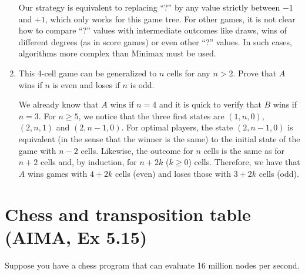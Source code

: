 \documentclass[11pt, a4paper]{article}
\begin{document}
\begin{enumerate}
\begin{solution}
\begin{figure}[H]
{}
        \end{figure}

        Our strategy is equivalent to replacing \enquote{?} by any value strictly between $-1$ and $+1$, which only works for this game tree. For other games, it is not clear how to compare \enquote{?} values with intermediate outcomes like draws, wins of different degrees (as in score games) or even other \enquote{?} values. In such cases, algorithms more complex than Minimax must be used.
    \end{solution}

    \item This 4-cell game can be generalized to $n$ cells for any $n > 2$. Prove that $A$ wins if $n$ is even and loses if $n$ is odd.

    \begin{solution}
        We already know that $A$ wins if $n = 4$ and it is quick to verify that $B$ wins if $n = 3$. For $n \geq 5$, we notice that the three first states are $(1, n, 0)$, $(2, n, 1)$ and $(2, n - 1, 0)$. For optimal players, the state $(2, n - 1, 0)$ is equivalent (in the sense that the winner is the same) to the initial state of the game with $n - 2$ cells. Likewise, the outcome for $n$ cells is the same as for $n + 2$ cells and, by induction, for $n + 2k$ ($k \geq 0$) cells. Therefore, we have that $A$ wins games with $4 + 2k$ cells (even) and loses those with $3 + 2k$ cells (odd).
    \end{solution}
\end{enumerate}

\newpage

\section{Chess and transposition table (AIMA, Ex 5.15)}

Suppose you have a chess program that can evaluate 16 million nodes per second.
\end{document}
